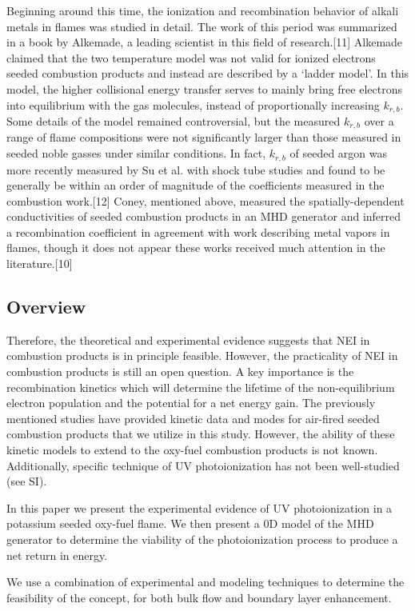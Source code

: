 Beginning around this time, the ionization and recombination behavior of alkali metals in flames was studied in detail. The work of this period was summarized in a book by Alkemade, a leading scientist in this field of research.[11] Alkemade claimed that the two temperature model was not valid for ionized electrons seeded combustion products and instead are described by a ‘ladder model’. In this model, the higher collisional energy transfer serves to mainly bring free electrons into equilibrium with the gas molecules, instead of proportionally increasing $k_{r,b}$. Some details of the model remained controversial, but the measured $k_{r,b}$ over a range of flame compositions were not significantly larger than those measured in seeded noble gasses under similar conditions. In fact, $k_{r,b}$  of seeded argon was more recently measured by Su et al. with shock tube studies and found to be generally be within an order of magnitude of the coefficients measured in the combustion work.[12] Coney, mentioned above, measured the spatially-dependent conductivities of seeded combustion products in an MHD generator and inferred a recombination coefficient in agreement with work describing metal vapors in flames, though it does not appear these works received much attention in the literature.[10]


\subsection{Overview}
Therefore, the theoretical and experimental evidence suggests that NEI in combustion products is in principle feasible. However, the practicality of NEI in combustion products is still an open question. A key importance is the recombination kinetics which will determine the lifetime of the non-equilibrium electron population and the potential for a net energy gain. The previously mentioned studies have provided kinetic data and modes for air-fired seeded combustion products that we utilize in this study. However, the ability of these kinetic models to extend to the oxy-fuel combustion products is not known. Additionally, specific technique of UV photoionization has not been well-studied (see SI).

In this paper we present the experimental evidence of UV photoionization in a potassium seeded oxy-fuel flame. We then present a 0D model of the MHD generator to determine the viability of the photoionization process to produce a net return in energy.

We use a combination of experimental and modeling techniques to determine the feasibility of the concept, for both bulk flow and boundary layer enhancement. 



